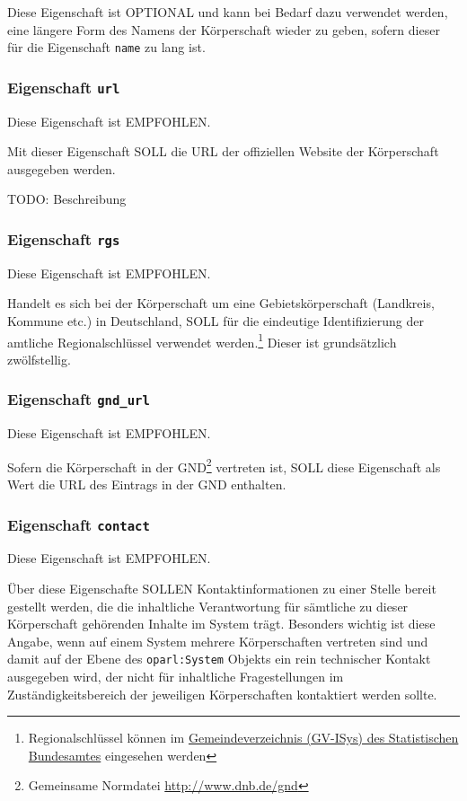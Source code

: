 \documentclass[,a4paper]{article}
\begin{document}
Diese Eigenschaft ist OPTIONAL und kann bei Bedarf dazu verwendet
werden, eine längere Form des Namens der Körperschaft wieder zu geben,
sofern dieser für die Eigenschaft \texttt{name} zu lang ist.

\subsubsection{Eigenschaft \texttt{url}}

Diese Eigenschaft ist EMPFOHLEN.

Mit dieser Eigenschaft SOLL die URL der offiziellen Website der
Körperschaft ausgegeben werden.

TODO: Beschreibung

\subsubsection{Eigenschaft \texttt{rgs}}

Diese Eigenschaft ist EMPFOHLEN.

Handelt es sich bei der Körperschaft um eine Gebietskörperschaft
(Landkreis, Kommune etc.) in Deutschland, SOLL für die eindeutige
Identifizierung der amtliche Regionalschlüssel verwendet
werden.\footnote{Regionalschlüssel können im
  \href{https://www.destatis.de/DE/ZahlenFakten/LaenderRegionen/Regionales/Gemeindeverzeichnis/Gemeindeverzeichnis.html}{Gemeindeverzeichnis
  (GV-ISys) des Statistischen Bundesamtes} eingesehen werden} Dieser ist
grundsätzlich zwölfstellig.

\subsubsection{Eigenschaft \texttt{gnd\_url}}

Diese Eigenschaft ist EMPFOHLEN.

Sofern die Körperschaft in der GND\footnote{Gemeinsame Normdatei
  \url{http://www.dnb.de/gnd}} vertreten ist, SOLL diese Eigenschaft als
Wert die URL des Eintrags in der GND enthalten.

\subsubsection{Eigenschaft \texttt{contact}}

Diese Eigenschaft ist EMPFOHLEN.

Über diese Eigenschafte SOLLEN Kontaktinformationen zu einer Stelle
bereit gestellt werden, die die inhaltliche Verantwortung für sämtliche
zu dieser Körperschaft gehörenden Inhalte im System trägt. Besonders
wichtig ist diese Angabe, wenn auf einem System mehrere Körperschaften
vertreten sind und damit auf der Ebene des \texttt{oparl:System} Objekts
ein rein technischer Kontakt ausgegeben wird, der nicht für inhaltliche
Fragestellungen im Zuständigkeitsbereich der jeweiligen Körperschaften
kontaktiert werden sollte.
\end{document}
